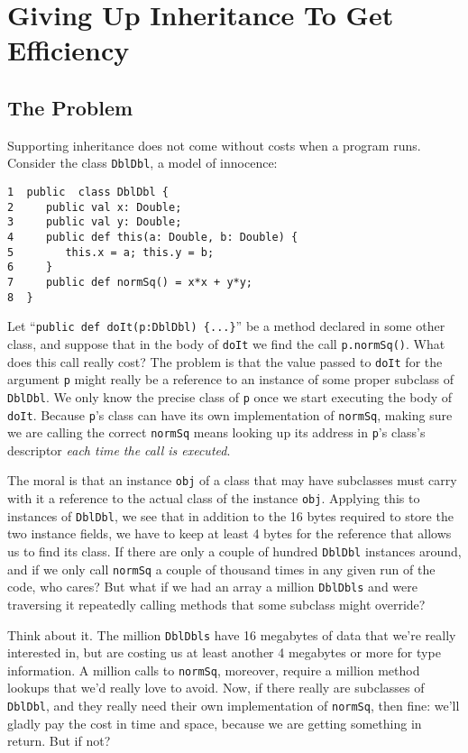 \section{Giving Up Inheritance To Get Efficiency}\label{sec:guitge}
\subsection{The Problem}

Supporting inheritance does not come without costs when a program runs.
Consider the class {\tt DblDbl}, a model of innocence:

\begin{verbatim}
1  public  class DblDbl {
2     public val x: Double;
3     public val y: Double;
4     public def this(a: Double, b: Double) {
5        this.x = a; this.y = b;
6     }
7     public def normSq() = x*x + y*y;
8  }
\end{verbatim}

Let ``{\tt public def doIt(p:DblDbl) \{...\}}'' be a method declared in some
other class, and suppose that in the body of {\tt doIt}
we find the call {\tt p.normSq()}.  What does this call really cost?
The problem is that the value passed to {\tt doIt} for the argument {\tt p}
might really be a reference to an instance of some proper subclass
of {\tt DblDbl}. We only know the precise class of {\tt p} once we start
executing the body of {\tt doIt}.  Because {\tt p}'s class can have its own
implementation of {\tt normSq}, making sure we are calling the correct
{\tt normSq} means looking up its address in {\tt p}'s class's 
descriptor {\em each time the call is executed}.

The moral is that an instance {\tt obj} of a class that may have subclasses
must carry with it a reference to the actual class of the instance {\tt obj}.
Applying this to instances of {\tt DblDbl}, we see that in addition to
the 16 bytes required to store the two instance fields, we have to keep
at least 4 bytes for the reference that allows us to find its class.
If there are only a couple of hundred {\tt DblDbl} instances around, and
if we only call {\tt normSq} a couple of thousand times in any
given run of the code, who cares?  But what if we had an array a million
{\tt DblDbls} and were traversing it repeatedly calling methods that
some subclass might override?

Think about it.  The million {\tt DblDbls} have
16 megabytes of data that we're really interested in, but are costing us
at least another 4 megabytes or more for type information.  A million
calls to {\tt normSq}, moreover, require a million method lookups that
we'd really love to avoid.  Now, if
there really are subclasses of {\tt DblDbl}, and they really need their own
implementation of {\tt normSq}, then fine: we'll gladly pay the cost in time
and space, because we are getting something in return. But if not? 

